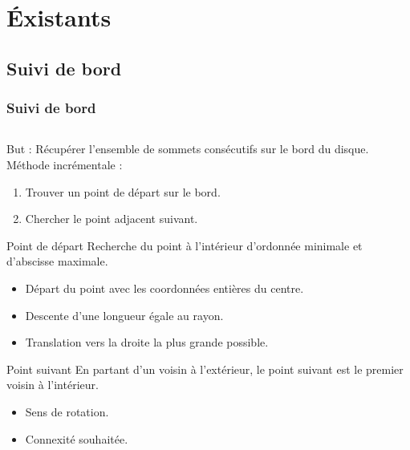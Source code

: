 \section{Éxistants}

\subsection{Suivi de bord}

\begin{frame}
\frametitle{Suivi de bord}


\begin{columns}[t]
  \begin{column}{0.6\linewidth}
    \begin{block}{}
      But  : Récupérer l'ensemble de sommets consécutifs sur le bord du disque.\\
      Méthode incrémentale :
      \begin{enumerate}
        \item<2-> Trouver un point de départ sur le bord.
        \item<3> Chercher le point adjacent suivant.
      \end{enumerate}
    \end{block}
    {
      \begin{block}{Point de départ}
        Recherche du point à l'intérieur d'ordonnée minimale et d'abscisse maximale.\\
        \begin{itemize}
          \item Départ du point avec les coordonnées entières du centre.
          \item Descente d'une longueur égale au rayon.
          \item Translation vers la droite la plus grande possible.
        \end{itemize}
      \end{block} 
    }
    {
      \begin{block}{Point suivant}
        En partant d'un voisin à l'extérieur, le point suivant est le premier voisin à l'intérieur. 
        \begin{itemize}
          \item Sens de rotation.
          \item Connexité souhaitée.

\end{itemize}
\end{block}}
\end{column}
\end{columns}
\end{frame}
